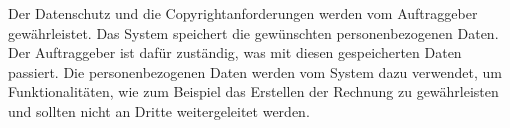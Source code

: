 \documentclass[../../Pflichtenheft.tex]{subfiles}
\begin{document}
    Der Datenschutz und die Copyrightanforderungen werden vom Auftraggeber gewährleistet.
    Das System speichert die gewünschten personenbezogenen Daten. Der Auftraggeber ist dafür zuständig, was mit diesen gespeicherten Daten passiert.
    Die personenbezogenen Daten werden vom System dazu verwendet, um Funktionalitäten, wie zum Beispiel das Erstellen der Rechnung zu gewährleisten
    und sollten nicht an Dritte weitergeleitet werden.
\end{document}
